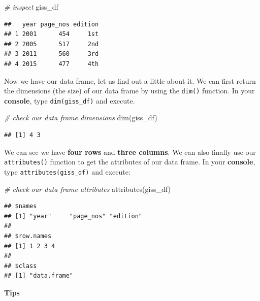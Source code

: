 \documentclass[
]{book}
\newenvironment{Shaded}{\begin{snugshade}}{\end{snugshade}}
\newcommand{\CommentTok}[1]{\textcolor[rgb]{0.56,0.35,0.01}{\textit{#1}}}
\newcommand{\FunctionTok}[1]{\textcolor[rgb]{0.00,0.00,0.00}{#1}}
\newcommand{\NormalTok}[1]{#1}
\begin{document}
\begin{Shaded}
\begin{Highlighting}[]
\CommentTok{\# inspect}
\NormalTok{giss\_df}
\end{Highlighting}
\end{Shaded}

\begin{verbatim}
##   year page_nos edition
## 1 2001      454     1st
## 2 2005      517     2nd
## 3 2011      560     3rd
## 4 2015      477     4th
\end{verbatim}

Now we have our data frame, let us find out a little about it. We can first return the dimensions (the size) of our data frame by using the \texttt{dim()} function. In your \textbf{console}, type \texttt{dim(giss\_df)} and execute.

\begin{Shaded}
\begin{Highlighting}[]
\CommentTok{\# check our data frame dimensions}
\FunctionTok{dim}\NormalTok{(giss\_df)}
\end{Highlighting}
\end{Shaded}

\begin{verbatim}
## [1] 4 3
\end{verbatim}

We can see we have \textbf{four rows} and \textbf{three columns}. We can also finally use our \texttt{attributes()} function to get the attributes of our data frame. In your \textbf{console}, type \texttt{attributes(giss\_df)} and execute:

\begin{Shaded}
\begin{Highlighting}[]
\CommentTok{\# check our data frame attributes}
\FunctionTok{attributes}\NormalTok{(giss\_df)}
\end{Highlighting}
\end{Shaded}

\begin{verbatim}
## $names
## [1] "year"     "page_nos" "edition" 
## 
## $row.names
## [1] 1 2 3 4
## 
## $class
## [1] "data.frame"
\end{verbatim}

\textbf{Tips}
\end{document}
